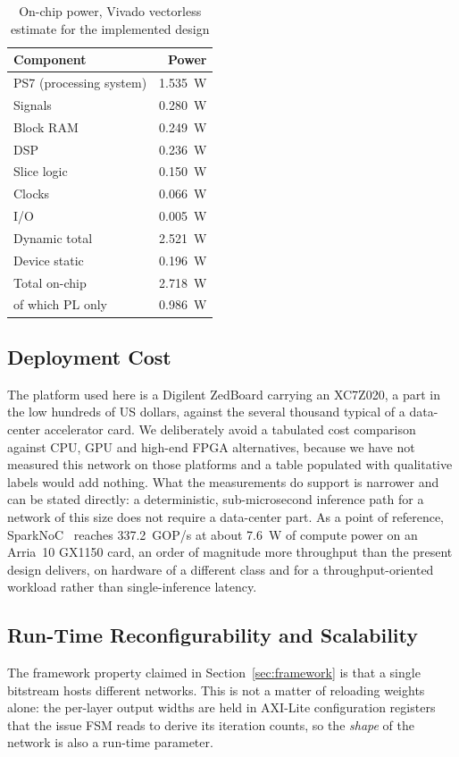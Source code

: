 \documentclass[final,5p,times,twocolumn]{elsarticle}
\begin{document}
\begin{table}[htbp]
\centering
\caption{On-chip power, Vivado vectorless estimate for the implemented design}
\label{tab:power}
\begin{tabular}{lr}
\toprule
Component & Power \\
\midrule
PS7 (processing system) & \SI{1.535}{\watt} \\
Signals                 & \SI{0.280}{\watt} \\
Block RAM               & \SI{0.249}{\watt} \\
DSP                     & \SI{0.236}{\watt} \\
Slice logic             & \SI{0.150}{\watt} \\
Clocks                  & \SI{0.066}{\watt} \\
I/O                     & \SI{0.005}{\watt} \\
\midrule
Dynamic total           & \SI{2.521}{\watt} \\
Device static           & \SI{0.196}{\watt} \\
\midrule
Total on-chip           & \SI{2.718}{\watt} \\
\quad of which PL only  & \SI{0.986}{\watt} \\
\bottomrule
\end{tabular}
\end{table}

\subsection{Deployment Cost}
The platform used here is a Digilent ZedBoard carrying an XC7Z020, a part in the
low hundreds of US dollars, against the several thousand typical of a
data-center accelerator card. We deliberately avoid a tabulated cost comparison
against CPU, GPU and high-end FPGA alternatives, because we have not measured
this network on those platforms and a table populated with qualitative labels
would add nothing. What the measurements do support is narrower and can be
stated directly: a deterministic, sub-microsecond inference path for a network
of this size does not require a data-center part. As a point of reference,
SparkNoC~\cite{sparknoc} reaches \SI{337.2}{GOP/s} at about \SI{7.6}{\watt} of
compute power on an Arria~10 GX1150 card, an order of magnitude more throughput
than the present design delivers, on hardware of a different class and for a
throughput-oriented workload rather than single-inference latency.

\subsection{Run-Time Reconfigurability and Scalability}
\label{sec:reconfig}
The framework property claimed in Section~\ref{sec:framework} is that a single
bitstream hosts different networks. This is not a matter of reloading weights
alone: the per-layer output widths are held in AXI-Lite configuration registers
that the issue FSM reads to derive its iteration counts, so the \emph{shape} of
the network is also a run-time parameter.
\end{document}
